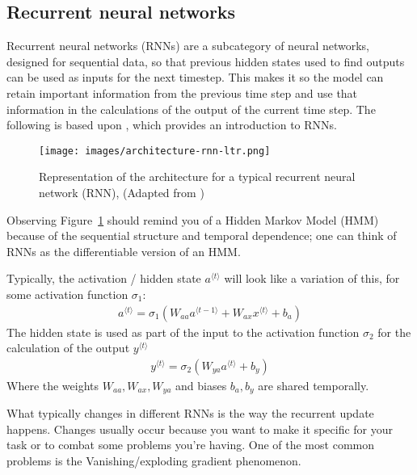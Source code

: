 \documentclass[a4paper,12pt]{article}
\begin{document}
\subsection{Recurrent neural networks}
Recurrent neural networks (RNNs) are a subcategory of neural networks, designed for sequential data, so that previous hidden states used to find outputs can be used as inputs for the next timestep.
This makes it so the model can retain important information from the previous time step and use that information in the calculations of the output of the current time step.
The following is based upon \cite{amidi_rnn_cheatsheet}, which provides an introduction to RNNs.
\begin{figure}[H]
\centering
\texttt{[image: images/architecture-rnn-ltr.png]}
\caption{Representation of the architecture for a typical recurrent neural network (RNN), (Adapted from \cite{amidi_rnn_cheatsheet})} %
\label{fig:n3}
\end{figure}
Observing Figure~\ref{fig:n3} should remind you of a Hidden Markov Model (HMM) because of the sequential structure and temporal dependence; one can think of RNNs as the differentiable version of an HMM.




Typically, the activation / hidden state $a^{\langle t \rangle}$ will look like a variation of this, for some activation function $\sigma_1$:
\begin{align}
a^{\langle t \rangle} = \sigma_1\left(W_{aa} a^{\langle t-1 \rangle} + W_{ax} x^{\langle t \rangle} + b_a\right)
\end{align}
The hidden state is used as part of the input to the activation function $\sigma_2$ for the calculation of the output $y^{\langle t \rangle}$
\begin{align}
y^{\langle t \rangle} = \sigma_2\left(W_{ya} a^{\langle t \rangle} + b_y\right)
\end{align}
Where the weights $W_{aa}, W_{ax}, W_{ya}$ and biases $b_a, b_y$ are shared temporally.




What typically changes in different RNNs is the way the recurrent update happens. Changes usually occur because you want to make it specific for your task or to combat some problems you're having. One of the most common problems is the Vanishing/exploding gradient phenomenon.
\end{document}
